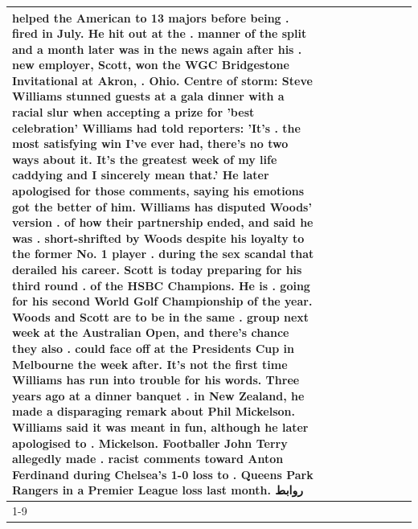 \begin{table}[H]
\begin{tabular}{lllrlllll}
helped the American to 13 majors before being . fired in July. He hit out at the . manner of the split and a month later was in the news again after his . new employer, Scott, won the WGC Bridgestone Invitational at Akron, . Ohio. Centre of storm: Steve Williams stunned guests at a gala dinner with a racial slur when accepting a prize for 'best celebration' Williams had told reporters: 'It's . the most satisfying win I've ever had, there's no two ways about it. It's the greatest week of my life caddying and I sincerely mean that.' He later apologised for those comments, saying his emotions got the better of him. Williams has disputed Woods' version . of how their partnership ended, and said he was . short-shrifted by Woods despite his loyalty to the former No. 1 player . during the sex scandal that derailed his career. Scott is today preparing for his third round . of the HSBC Champions. He is . going for his second World Golf Championship of the year. Woods and Scott are to be in the same . group next week at the Australian Open, and there's chance they also . could face off at the Presidents Cup in Melbourne the week after. It's not the first time Williams has run into trouble for his words. Three years ago at a dinner banquet . in New Zealand, he made a disparaging remark about Phil Mickelson. Williams said it was meant in fun, although he later apologised to . Mickelson. Footballer John Terry allegedly made . racist comments toward Anton Ferdinand during Chelsea's 1-0 loss to . Queens Park Rangers in a Premier League loss last month. روابط \\
\cline{1-9}

\end{tabular}
\end{table}

